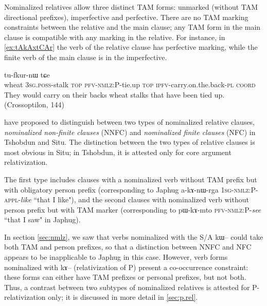 \documentclass[oldfontcommands,oneside,a4paper,11pt]{article}
\newcommand{\ipa}[1]{{\phon #1}} %
\begin{document}
Nominalized relatives allow three distinct TAM forms: unmarked (without TAM directional prefixes), imperfective and perfective. There are no  TAM marking constraints between the relative and the main clause; any TAM form in the main clause is compatible with any marking in the relative. For instance, in \ref{ex:tAkAxtCAr} the verb of the relative clause has perfective marking, while the finite verb of the main clause is in the imperfective. 

%

\begin{exe}
\ex \label{ex:tAkAxtCAr}
\gll
	[\textbf{\ipa{qɤj}}  	\textbf{\ipa{ɯ-ru}}  	\ipa{nɯnɯ}  	\ipa{tɤ-kɤ-xtɕɤr}]  	\ipa{nɯ}  	\ipa{tu-fkur-nɯ}  	\ipa{tɕe}  \\
wheat	\textsc{3sg.poss}-stalk \textsc{top} \textsc{pfv-nmlz:P}-tie.up \textsc{top} \textsc{ipfv}-carry.on.the.back-\textsc{pl} \textsc{coord} \\
	\glt They would carry on their backs wheat stalks that have been tied up.	(Crossoptilon, 144)
	  \end{exe} 


\citet{jacksonlin07} have proposed to distinguish between two types of nominalized relative clauses, \textit{nominalized non-finite clauses} (NNFC) and \textit{nominalized finite clauses} (NFC) in Tshobdun and Situ. The distinction between the two types of relative clauses is most obvious in Situ; in Tshobdun, it is attested only for core argument relativization.

The first type includes clauses with a nominalized verb without TAM prefix but with obligatory person prefix (corresponding to Japhug \ipa{a-kɤ-nɯ-rga} \textsc{1sg-nmlz:P-appl}-\textit{like} ``that I like"), and the second clauses with nominalized verb without person prefix but with TAM marker (corresponding to \ipa{pɯ-kɤ-mto} \textsc{pfv-nmlz:}P-\textit{see} ``that I saw" in Japhug). 

In section \ref{sec:nmlz}, we saw that  verbs nominalized with the S/A \ipa{kɯ}-- could take both TAM and person prefixes, so that a distinction between NNFC and NFC appears to be inapplicable to Japhug in this case. However, verb forms nominalized with \ipa{kɤ}-- (relativization of P) present a  co-occurrence constraint: these forms can either have TAM prefixes or personal prefixes, but not both. Thus, a contrast between two subtypes of nominalized relatives is attested for P-relativization only; it is discussed in more detail in \ref{sec:p.rel}.
\end{document}
